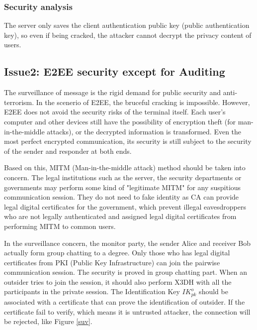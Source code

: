 \documentclass[11pt,en]{elegantpaper}
\begin{document}
\subsubsection*{Security analysis}

The server only saves the client authentication public key (public authentication key), so even if being cracked, the attacker cannot decrypt the privacy content of users.

\subsection{Issue2: E2EE security except for Auditing}


The surveillance of message is the rigid demand for public security and anti-terrorism. In the scenerio of E2EE, the bruceful cracking is impossible. However, E2EE does not avoid the security risks of the terminal itself. Each user's computer and other devices still have the possibility of encryption theft (for man-in-the-middle attacks), or the decrypted information is transformed. Even the most perfect encrypted communication, its security is still subject to the security of the sender and responder at both ends.

Based on this, MITM (Man-in-the-middle attack) method should be taken into concern. The legal institutions such as the server, the security departments or governments may perform some kind of "legitimate MITM" for any suspitious communication session. They do not need to fake identity as CA can provide legal digital certificates for the government, which prevent illegal eavesdroppers who are not legally authenticated and assigned legal digital certificates from performing MITM to common users.

In the surveillance concern, the monitor party, the sender Alice and receiver Bob actually form group chatting to a degree. Only those who has legal digital certificates from PKI (Public Key Infrastructure) can join the pairwise communication session. The security is proved in group chatting part. When an outsider tries to join the session, it should also perform X3DH with all the participants in the private session. The Identification Key $IK_{pk}^o$ should be associated with a certificate that can prove the identification of outsider. If the certificate fail to verify, which means it is untrusted attacker, the connection will be rejected, like Figure \ref{suv}.
\end{document}
